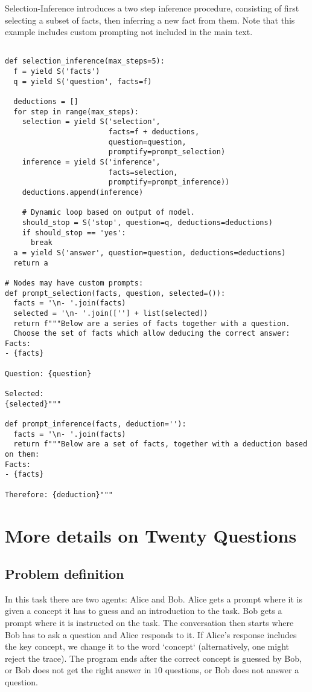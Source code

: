 Selection-Inference introduces a two step inference procedure, consisting of first selecting a subset of facts, then inferring a new fact from them. Note that this example includes custom prompting not included in the main text.
\begin{verbatim}

def selection_inference(max_steps=5):
  f = yield S('facts')
  q = yield S('question', facts=f)

  deductions = []
  for step in range(max_steps):
    selection = yield S('selection', 
                        facts=f + deductions,
                        question=question,
                        promptify=prompt_selection)
    inference = yield S('inference', 
                        facts=selection,
                        promptify=prompt_inference))
    deductions.append(inference)

    # Dynamic loop based on output of model.
    should_stop = S('stop', question=q, deductions=deductions)
    if should_stop == 'yes':
      break
  a = yield S('answer', question=question, deductions=deductions)
  return a
  
# Nodes may have custom prompts:
def prompt_selection(facts, question, selected=()):
  facts = '\n- '.join(facts)
  selected = '\n- '.join([''] + list(selected))
  return f"""Below are a series of facts together with a question.
  Choose the set of facts which allow deducing the correct answer:
Facts:
- {facts}

Question: {question}

Selected:
{selected}"""

def prompt_inference(facts, deduction=''):
  facts = '\n- '.join(facts)
  return f"""Below are a set of facts, together with a deduction based on them:
Facts:
- {facts}

Therefore: {deduction}"""
\end{verbatim}



\section{More details on Twenty Questions}
\label{app:20q-details}

\subsection{Problem definition}

In this task there are two agents: Alice and Bob. Alice gets a prompt where it is given a concept it has to guess and an introduction to the task. Bob gets a prompt where it is instructed on the task. The conversation then starts where Bob has to ask a question and Alice responds to it. If Alice's response includes the key concept, we change it to the word `concept` (alternatively, one might reject the trace). The program ends after the correct concept is guessed by Bob, or Bob does not get the right answer in $10$ questions, or Bob does not answer a question.

